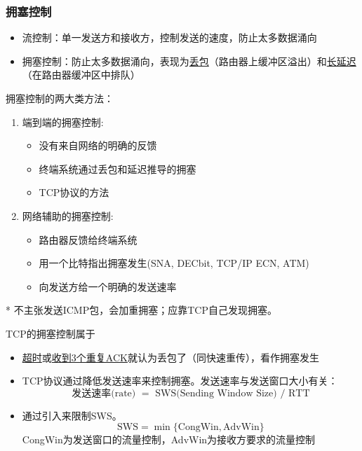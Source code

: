 \subsubsection{拥塞控制}
\begin{itemize}
\item 流控制：单一发送方和接收方，控制发送的速度，防止太多数据涌向
\item 拥塞控制：防止太多数据涌向，表现为\underline{丢包}（路由器上缓冲区溢出）和\underline{长延迟}（在路由器缓冲区中排队）
\end{itemize}

\myhline
拥塞控制的两大类方法：
\begin{enumerate}
    \item 端到端的拥塞控制:
\begin{itemize}
    \item 没有来自网络的明确的反馈
    \item 终端系统通过丢包和延迟推导的拥塞
    \item TCP协议的方法
\end{itemize}
    \item 网络辅助的拥塞控制:
\begin{itemize}
    \item 路由器反馈给终端系统
    \item 用一个比特指出拥塞发生(SNA, DECbit, TCP/IP ECN, ATM)
    \item 向发送方给一个明确的发送速率
\end{itemize}
\end{enumerate}
* 不主张发送ICMP包，会加重拥塞；应靠TCP自己发现拥塞。

TCP的拥塞控制属于
\begin{itemize}
    \item \underline{超时}或\underline{收到3个重复ACK}就认为丢包了（同快速重传），看作拥塞发生
    \item TCP协议通过降低发送速率来控制拥塞。发送速率与发送窗口大小有关：
\[\text{发送速率(rate) $=$ SWS(Sending Window Size) $/$ RTT}\]
    \item 通过引入来限制SWS。
\[\text{SWS} = \min\{\text{CongWin}, \text{AdvWin}\}\]
    CongWin为发送窗口的流量控制，AdvWin为接收方要求的流量控制
\end{itemize}

